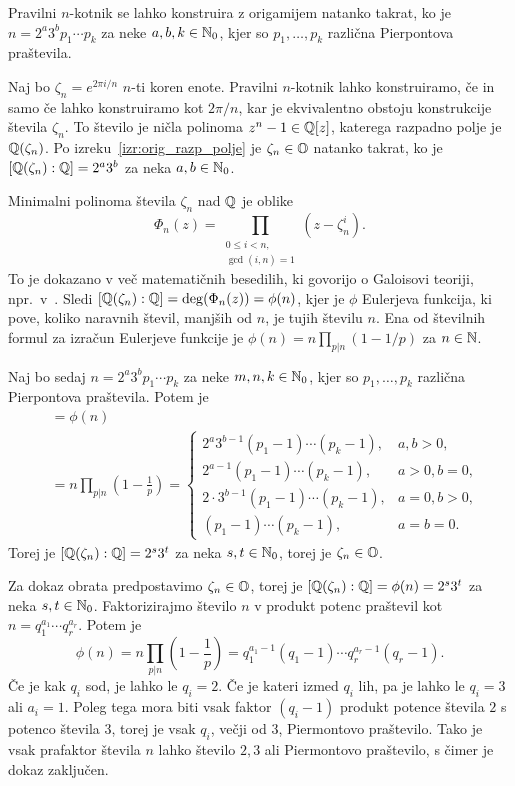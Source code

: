 \begin{izrek}
    Pravilni $n$-kotnik se lahko konstruira z origamijem natanko takrat, ko je $n = 2^a 3^b p_1 \cdots p_k$ za neke $a,b,k \in \mathbb N_0$, kjer so $p_1, \ldots, p_k$ različna Pierpontova praštevila.
\end{izrek}
\begin{dokaz}
    Naj bo $\zeta_n = e^{2 \pi i / n}$ $n$-ti koren enote. Pravilni $n$-kotnik lahko konstruiramo, če in samo če lahko konstruiramo kot $2 \pi / n$, kar je ekvivalentno obstoju konstrukcije števila $\zeta_n$. To število je ničla polinoma $z^n - 1 \in \mathbb Q[z]$, katerega razpadno polje je $\mathbb Q(\zeta_n)$. Po izreku~\ref{izr:orig_razp_polje} je $\zeta_n \in \mathbb O$ natanko takrat, ko je $[\mathbb Q(\zeta_n) : \mathbb Q] = 2^a3^b$ za neka $a, b \in \mathbb N_0$.

    Minimalni polinoma števila $\zeta_n$ nad $\mathbb Q$ je oblike
    $$ \Phi_n(z) = \prod_{\substack{0 \leq i < n, \\ \gcd(i,n)=1}} (z - \zeta_n^i). $$
    To je dokazano v več matematičnih besedilih, ki govorijo o Galoisovi teoriji, npr.\ v~\cite[poglavje $9.1$]{cox2005}.
    Sledi $[\mathbb Q(\zeta_n) : \mathbb Q] = \deg(\Phi_n(z)) = \phi(n)$, kjer je $\phi$ Eulerjeva funkcija, ki pove, koliko naravnih števil, manjših od $n$, je tujih številu $n$. Ena od številnih formul za izračun Eulerjeve funkcije je $\phi(n) = n \prod_{p|n} (1 - 1/p)$ za $n \in \mathbb N$.

    Naj bo sedaj $n = 2^a 3^b p_1 \cdots p_k$ za neke $m,n,k \in \mathbb N_0$, kjer so $p_1, \ldots, p_k$ različna Pierpontova praštevila. Potem je
    \begin{align*}
        [\Q(\zeta_n) : \Q] &= \phi(n) \\
        &= n \prod_{p|n} (1 - \frac{1}{p}) =
        \begin{cases}
            2^a3^{b-1}(p_1 -1) \cdots (p_k -1), &a,b>0,\\
            2^{a-1}(p_1 -1) \cdots (p_k -1), &a>0, b=0,\\
            2 \cdot 3^{b-1}(p_1 -1) \cdots (p_k -1), &a=0,b>0,\\
            (p_1 -1) \cdots (p_k -1), &a=b=0.
            \end{cases}
    \end{align*}
    Torej je $[\mathbb Q(\zeta_n) : \mathbb Q] = 2^s3^t$ za neka $s,t \in \mathbb N_0$, torej je $\zeta_n \in \mathbb O$.

    Za dokaz obrata predpostavimo $\zeta_n \in \mathbb O$, torej je $[\mathbb Q(\zeta_n) : \mathbb Q] = \phi(n) = 2^s3^t$ za neka $s,t \in \mathbb N_0$. Faktorizirajmo število $n$ v produkt potenc praštevil kot $n = q_1^{a_1} \cdots q_r^{a_r}$. Potem je
    $$ \phi(n) = n \prod_{p|n} (1 - \frac{1}{p}) = q_1^{a_1-1} (q_1 -1) \cdots q_r^{a_r-1} (q_r -1).$$
    Če je kak $q_i$ sod, je lahko le $q_i = 2$. Če je kateri izmed $q_i$ lih, pa je lahko le $q_i = 3$ ali $a_i = 1$. Poleg tega mora biti vsak faktor $(q_i - 1)$ produkt potence števila $2$ s potenco števila $3$, torej je vsak $q_i$, večji od $3$, Piermontovo praštevilo. Tako je vsak prafaktor števila $n$ lahko število $2, 3$ ali Piermontovo praštevilo, s čimer je dokaz zaključen.
\end{dokaz}

